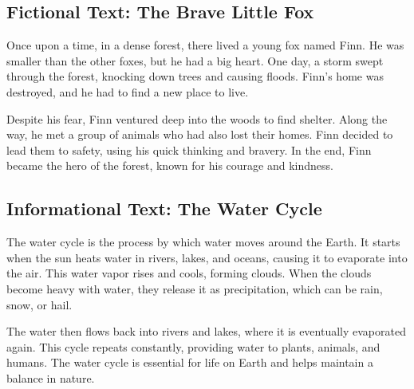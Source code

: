 \documentclass[12pt]{article}
\begin{document}
\onehalfspacing

\subsection*{Fictional Text: The Brave Little Fox}

\begin{tcolorbox}[colframe=black!40, colback=gray!5]
\begin{spacing}{1.15}
Once upon a time, in a dense forest, there lived a young fox named Finn. He was smaller than the other foxes, but he had a big heart. One day, a storm swept through the forest, knocking down trees and causing floods. Finn’s home was destroyed, and he had to find a new place to live. 

Despite his fear, Finn ventured deep into the woods to find shelter. Along the way, he met a group of animals who had also lost their homes. Finn decided to lead them to safety, using his quick thinking and bravery. In the end, Finn became the hero of the forest, known for his courage and kindness.

\end{spacing}
\end{tcolorbox}

\vspace{1cm}

\subsection*{Informational Text: The Water Cycle}

\begin{tcolorbox}[colframe=black!40, colback=gray!5]
\begin{spacing}{1.15}
The water cycle is the process by which water moves around the Earth. It starts when the sun heats water in rivers, lakes, and oceans, causing it to evaporate into the air. This water vapor rises and cools, forming clouds. When the clouds become heavy with water, they release it as precipitation, which can be rain, snow, or hail. 

The water then flows back into rivers and lakes, where it is eventually evaporated again. This cycle repeats constantly, providing water to plants, animals, and humans. The water cycle is essential for life on Earth and helps maintain a balance in nature.

\end{spacing}
\end{tcolorbox}
\end{document}

